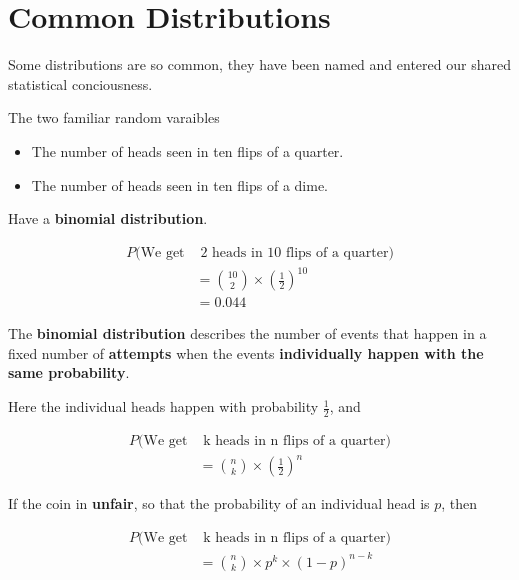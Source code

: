 \section{Common Distributions}

\begin{frame}
Some distributions are so common, they have been named and entered our shared
statistical conciousness.
\end{frame}
%

%
\begin{frame}
The two familiar random varaibles

\begin{itemize}
\item The number of heads seen in ten flips of a quarter.
\item The number of heads seen in ten flips of a dime.
\end{itemize}

Have a \textbf{binomial distribution}.

\end{frame}
%

%
\begin{frame}

\begin{align*}
P(\text{We get} & \text{ 2 heads in 10 flips of a quarter}) \\
%
&= {{10}\choose{2}} \times \left(\frac{1}{2} \right)^{10} \\
%
&= 0.044
\end{align*}

\end{frame}
%

%
\begin{frame}

The \textbf{binomial distribution} describes the number of events that happen in
a fixed number of \textbf{attempts} when the events \textbf{individually happen
with the same probability}.

Here the individual heads happen with probability $\frac{1}{2}$, and

\begin{align*}
P(\text{We get} & \text{ k heads in n flips of a quarter}) \\
%
&= {{n}\choose{k}} \times \left(\frac{1}{2} \right)^n
\end{align*}

\end{frame}
%

%
\begin{frame}
If the coin in \textbf{unfair}, so that the probability of an individual head is
$p$, then

\begin{align*}
P(\text{We get} & \text{ k heads in n flips of a quarter}) \\
%
&= {{n}\choose{k}} \times p^k \times (1 - p)^{n - k}
\end{align*}

\end{frame}
%

